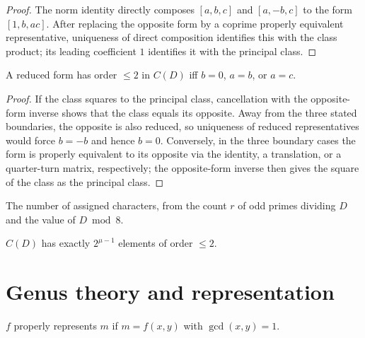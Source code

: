 \begin{proof}\leanok
The norm identity directly composes $[a,b,c]$ and $[a,-b,c]$ to the form
$[1,b,ac]$. After replacing the opposite form by a coprime properly equivalent
representative, uniqueness of direct composition identifies this with the class
product; its leading coefficient $1$ identifies it with the principal class.
\end{proof}

\begin{lemma}
  \label{lem:l3_10}
  \leanok
  A reduced form has order $\le 2$ in $C(D)$ iff $b=0$, $a=b$, or $a=c$.
\end{lemma}
\begin{proof}\leanok
If the class squares to the principal class, cancellation with the opposite-form
inverse shows that the class equals its opposite. Away from the three stated
boundaries, the opposite is also reduced, so uniqueness of reduced representatives
would force $b=-b$ and hence $b=0$. Conversely, in the three boundary cases the
form is properly equivalent to its opposite via the identity, a translation, or
a quarter-turn matrix, respectively; the opposite-form inverse then gives the
square of the class as the principal class.
\end{proof}

\begin{definition}
  \label{def:mu}
  \leanok
  The number of assigned characters, from the count $r$ of odd primes dividing $D$
  and the value of $D \bmod 8$.
\end{definition}

\begin{proposition}
  \label{prop:p3_11}
  \leanok
  $C(D)$ has exactly $2^{\mu-1}$ elements of order $\le 2$.
\end{proposition}

\section{Genus theory and representation}

\begin{definition}
  \label{def:represents}
  \leanok
  $f$ properly represents $m$ if $m = f(x,y)$ with $\gcd(x,y) = 1$.
\end{definition}

